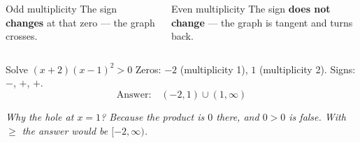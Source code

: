 \documentclass[aspectratio=169, 11pt]{beamer}
\begin{document}
\begin{frame}[t, plain]

  \begin{columns}[T]
      \begin{block}{Odd multiplicity}
        The sign \textbf{changes} at that zero --- the graph crosses.
      \end{block}

      \begin{block}{Even multiplicity}
        The sign \textbf{does not change} --- the graph is tangent and turns
        back.
      \end{block}
  \end{columns}

  \bigskip
  \begin{block}{Solve \((x+2)(x-1)^2 > 0\)}
    Zeros: \(-2\) (multiplicity 1), \(1\) (multiplicity 2).
    Signs: \(-\), \(+\), \(+\).
    \[ \text{Answer:}\quad (-2,1) \cup (1,\infty) \]
  \end{block}

  \bigskip
  \textit{Why the hole at \(x = 1\)? Because the product is \(0\) there, and
  \(0 > 0\) is false. With \(\ge\) the answer would be \([-2,\infty)\).}
\end{frame}
\end{document}
